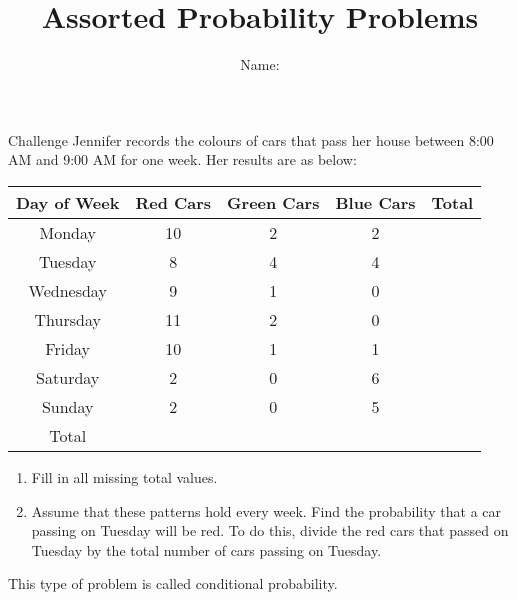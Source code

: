 \documentclass[12pt,letterpaper]{article}
\title{Assorted Probability Problems}
\author{Name: \underline{\hspace{5cm}}}
\begin{document}
\maketitle

\thispagestyle{empty}

\begin{problem}{Challenge}
 Jennifer records the colours of cars that pass her house between 8:00 AM and
 9:00 AM for one week. Her results are as below:
 \vspace{0.5cm}
 \renewcommand{\arraystretch}{1.2}

 \begin{center}
  \begin{tabular}{|c|c|c|c|c|}
  \hline
  Day of Week & Red Cars & Green Cars & Blue Cars & Total \\ \hline
  Monday & 10 & 2 & 2 & \hspace{4cm} \\
  Tuesday & 8 & 4 & 4 & \\
  Wednesday & 9 & 1 & 0 & \\
  Thursday & 11 & 2 & 0 & \\
  Friday & 10 & 1 & 1 & \\
  Saturday & 2 & 0 & 6 & \\
  Sunday & 2 & 0 & 5 & \\ \hline
  Total & & & & \\ \hline
  \end{tabular}
 \end{center}

 \begin{enumerate}
  \item Fill in all missing total values.
  \item Assume that these patterns hold every week. Find the probability that a
  car passing on Tuesday will be red. To do this, divide the red cars that
  passed on Tuesday by the total number of cars passing on Tuesday.
 \end{enumerate}

 This type of problem is called conditional probability.

\end{problem}
\end{document}

